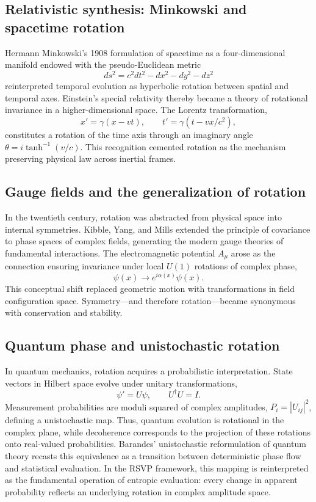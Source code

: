 \documentclass[12pt,a4paper]{article}
\theoremstyle{plain}
\begin{document}
\subsection{Relativistic synthesis: Minkowski and spacetime rotation}
Hermann Minkowski’s 1908 formulation of spacetime as a four-dimensional manifold endowed with the pseudo-Euclidean metric
\[
ds^2 = c^2dt^2 - dx^2 - dy^2 - dz^2
\]
reinterpreted temporal evolution as hyperbolic rotation between spatial and temporal axes.
Einstein’s special relativity thereby became a theory of rotational invariance in a higher-dimensional space.
The Lorentz transformation,
\[
x' = \gamma(x - vt), \qquad t' = \gamma(t - vx/c^2),
\]
constitutes a rotation of the time axis through an imaginary angle \(\theta = i\tanh^{-1}(v/c)\).
This recognition cemented rotation as the mechanism preserving physical law across inertial frames.

\subsection{Gauge fields and the generalization of rotation}
In the twentieth century, rotation was abstracted from physical space into internal symmetries.
Kibble, Yang, and Mills extended the principle of covariance to phase spaces of complex fields, generating the modern gauge theories of fundamental interactions.
The electromagnetic potential \(A_\mu\) arose as the connection ensuring invariance under local \(U(1)\) rotations of complex phase,
\[
\psi(x)\rightarrow e^{i\alpha(x)}\psi(x).
\]
This conceptual shift replaced geometric motion with transformations in field configuration space.  
Symmetry—and therefore rotation—became synonymous with conservation and stability.

\subsection{Quantum phase and unistochastic rotation}
In quantum mechanics, rotation acquires a probabilistic interpretation.
State vectors in Hilbert space evolve under unitary transformations,
\[
\psi' = U\psi, \qquad U^\dagger U = I.
\]
Measurement probabilities are moduli squared of complex amplitudes, \(P_i = |U_{ij}|^2\), defining a unistochastic map.
Thus, quantum evolution is rotational in the complex plane, while decoherence corresponds to the projection of these rotations onto real-valued probabilities.
Barandes’ unistochastic reformulation of quantum theory recasts this equivalence as a transition between deterministic phase flow and statistical evaluation.
In the RSVP framework, this mapping is reinterpreted as the fundamental operation of entropic evaluation: every change in apparent probability reflects an underlying rotation in complex amplitude space.
\end{document}
